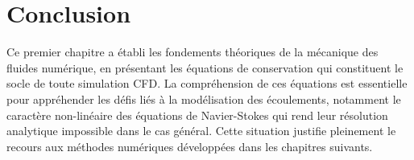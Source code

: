 \section{Conclusion}
\label{sec:conclusion_chap1}

Ce premier chapitre a établi les fondements théoriques de la mécanique des fluides numérique, en présentant les équations de conservation qui constituent le socle de toute simulation CFD. La compréhension de ces équations est essentielle pour appréhender les défis liés à la modélisation des écoulements, notamment le caractère non-linéaire des équations de Navier-Stokes qui rend leur résolution analytique impossible dans le cas général. Cette situation justifie pleinement le recours aux méthodes numériques développées dans les chapitres suivants.